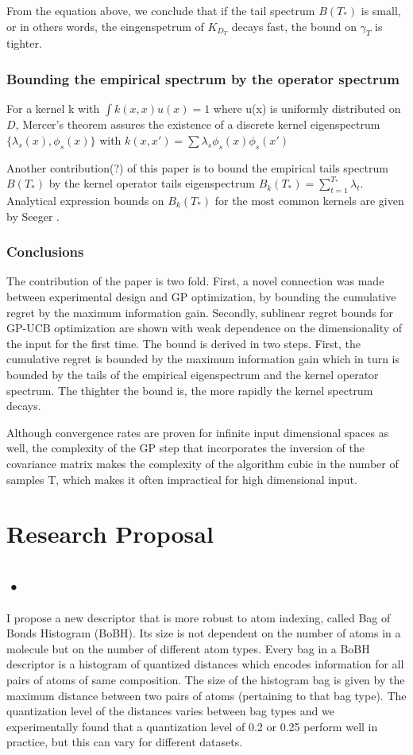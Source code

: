 \documentclass[10pt,journal,a4paper]{IEEEtran}
\begin{document}
From the equation above, we conclude that if the tail spectrum $B(T_{*})$ is small, or in others words, the eingenspetrum of $K_{D_T}$ decays fast, the bound on $\gamma_T$ is tighter.		
\subsubsection{Bounding the empirical spectrum by the operator spectrum}		
For a kernel k with $\int k(x,x)u(x)=1$ where u(x) is uniformly distributed on $D$, Mercer's theorem assures the existence of a discrete kernel eigenspectrum $\{\lambda_s(x), \phi_s(x) \}$		
with $k(x,x') = \sum \lambda_s\phi_s(x) \phi_s(x')$		
		
Another contribution(?) of this paper is to bound the empirical tails spectrum $B(T_{*})$ by the kernel operator tails eigenspectrum $B_k(T_{*}) = \sum_{t=1}^{T_*}\lambda_t $. Analytical expression bounds on $B_k(T_{*})$ for the most common kernels are given by Seeger \cite{NonGP}.		
		
\subsubsection{Conclusions}		
The contribution of the paper is two fold. First, a novel connection was made between experimental design and GP optimization, by bounding the cumulative regret by the maximum information gain. Secondly, sublinear regret bounds for GP-UCB optimization are shown with weak dependence on the dimensionality of the input for the first time. 		
 The bound is derived in two steps. First, the cumulative regret is bounded by the maximum information gain which in turn is bounded by the tails of the empirical eigenspectrum and the kernel operator spectrum. The thighter the bound is, the more rapidly the kernel spectrum decays. 

Although convergence rates are proven for infinite input dimensional spaces as well, the complexity of the GP step that incorporates the inversion of the covariance matrix makes the complexity of the algorithm cubic in the number of samples T, which makes it often impractical for high dimensional input.

\section{Research Proposal}
\subsection*{•}
I propose a new descriptor that is more robust to atom indexing, called Bag of Bonds Histogram (BoBH). Its size is not dependent on the number of atoms in a molecule but on the number of different atom types. Every bag in a BoBH descriptor is a histogram of quantized distances which encodes information for all pairs of atoms of same composition. The size of the histogram bag is given by the maximum distance between two pairs of atoms (pertaining to that bag type). The quantization level of the distances varies between bag types and we experimentally found that a quantization level of 0.2 or 0.25 perform well in practice, but this can vary for different datasets.
\end{document}
